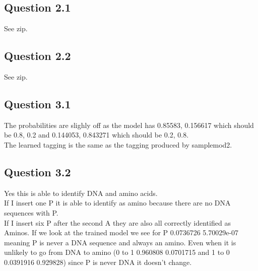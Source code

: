 \documentclass[11pt]{article}
\begin{document}
\subsection{Question 2.1}
See zip.
\subsection{Question 2.2}
See zip.
\subsection{Question 3.1}
The probabilities are slighly off as the model has 0.85583, 0.156617 which should be 0.8, 0.2 and 0.144053, 0.843271 which should be 0.2, 0.8. \\
The learned tagging is the same as the tagging produced by samplemod2.
\subsection{Question 3.2}
Yes this is able to identify DNA and amino acids. \\
If I insert one P it is able to identify as amino because there are no DNA sequences with P.\\
If I insert six P after the second A they are also all correctly identified as Aminos. If we look at the trained model we see for P 0.0736726 5.70029e-07 meaning P is never a DNA sequence and always an amino. Even when it is unlikely to go from DNA to amino (0 to 1 0.960808 0.0701715 and 1 to 0 0.0391916 0.929828) since P is never DNA it doesn't change.  
\end{document}
